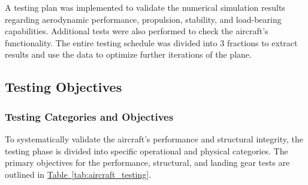\documentclass[10pt, letterpaper]{article}
\begin{document}
 A testing plan was implemented to validate the numerical simulation results regarding aerodynamic performance, propulsion, stability, and load-bearing capabilities. Additional tests were also performed to check the aircraft's functionality. The entire testing schedule was divided into 3 fractions to extract results and use the data to optimize further iterations of the plane.



\subsection{Testing Objectives}

\subsubsection{Testing Categories and Objectives}
To systematically validate the aircraft's performance and structural integrity, the testing phase is divided into specific operational and physical categories. The primary objectives for the performance, structural, and landing gear tests are outlined in \hyperref[tab:aircraft_testing]{Table~\ref*{tab:aircraft_testing}}.

\vspace{-0.1em}

\end{document}

